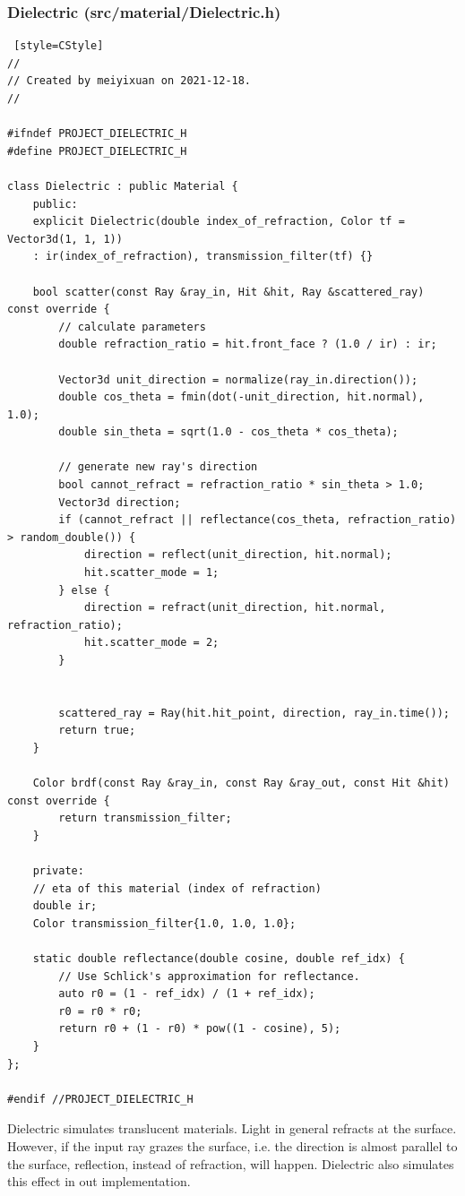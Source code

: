 \documentclass[utf8]{article}
\begin{document}
\subsubsection{Dielectric (src/material/Dielectric.h)}
\begin{lstlisting} [style=CStyle]
//
// Created by meiyixuan on 2021-12-18.
//

#ifndef PROJECT_DIELECTRIC_H
#define PROJECT_DIELECTRIC_H

class Dielectric : public Material {
	public:
	explicit Dielectric(double index_of_refraction, Color tf = Vector3d(1, 1, 1))
	: ir(index_of_refraction), transmission_filter(tf) {}
	
	bool scatter(const Ray &ray_in, Hit &hit, Ray &scattered_ray) const override {
		// calculate parameters
		double refraction_ratio = hit.front_face ? (1.0 / ir) : ir;
		
		Vector3d unit_direction = normalize(ray_in.direction());
		double cos_theta = fmin(dot(-unit_direction, hit.normal), 1.0);
		double sin_theta = sqrt(1.0 - cos_theta * cos_theta);
		
		// generate new ray's direction
		bool cannot_refract = refraction_ratio * sin_theta > 1.0;
		Vector3d direction;
		if (cannot_refract || reflectance(cos_theta, refraction_ratio) > random_double()) {
			direction = reflect(unit_direction, hit.normal);
			hit.scatter_mode = 1;
		} else {
			direction = refract(unit_direction, hit.normal, refraction_ratio);
			hit.scatter_mode = 2;
		}
		
		
		scattered_ray = Ray(hit.hit_point, direction, ray_in.time());
		return true;
	}
	
	Color brdf(const Ray &ray_in, const Ray &ray_out, const Hit &hit) const override {
		return transmission_filter;
	}
	
	private:
	// eta of this material (index of refraction)
	double ir;
	Color transmission_filter{1.0, 1.0, 1.0};
	
	static double reflectance(double cosine, double ref_idx) {
		// Use Schlick's approximation for reflectance.
		auto r0 = (1 - ref_idx) / (1 + ref_idx);
		r0 = r0 * r0;
		return r0 + (1 - r0) * pow((1 - cosine), 5);
	}
};

#endif //PROJECT_DIELECTRIC_H

\end{lstlisting}
Dielectric simulates translucent materials. Light in general refracts at the surface. However, if the input ray grazes the surface, i.e. the direction is almost parallel to the surface, reflection, instead of refraction, will happen. Dielectric also simulates this effect in out implementation.
\end{document}
